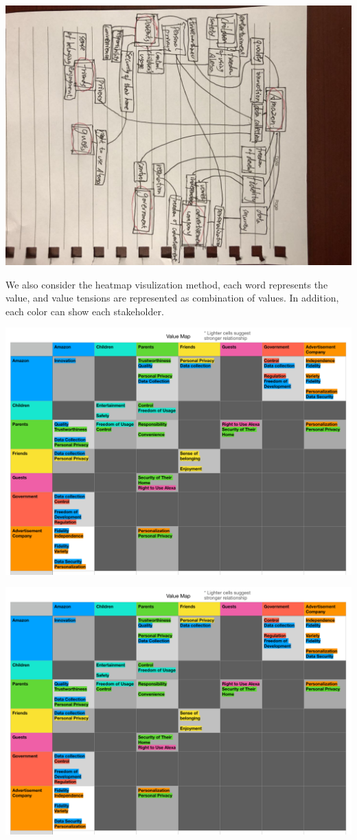 \documentclass{article}
\begin{document}
\includegraphics[scale=0.3,angle=90]{iter_4.jpeg}

We also consider the heatmap visulization method, each word represents the value, and value tensions are represented as combination of values. In addition, each color can show each stakeholder.

\includegraphics[scale=0.35]{heat_map_1.png}

\includegraphics[scale=0.35]{heat_map_1.png}
\end{document}
